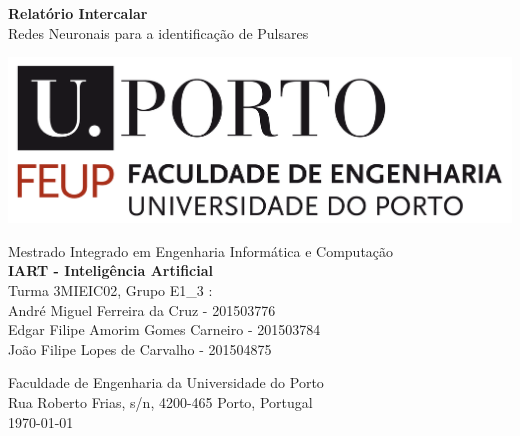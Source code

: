 \begin{titlepage}
  \begin{center}
    \vspace*{1cm}
    
	
      \Huge
      \textbf{Relatório Intercalar}\\
      \vspace{0.5cm}
      \LARGE Redes Neuronais para a identificação de Pulsares

    \vspace{1.5cm}

    \includegraphics[scale=0.15]{img/feup_logo.png}
    
	\vfill
	
	\Large{Mestrado Integrado em Engenharia Informática e Computação}\\
    \vspace{0.5cm}
	\Large\textbf{IART - Inteligência Artificial}\\
    
    \vspace{0.8cm}
    \large
    Turma 3MIEIC02, Grupo E1\_3 :\\
    André Miguel Ferreira da Cruz - 201503776\\
    Edgar Filipe Amorim Gomes Carneiro - 201503784\\
	João Filipe Lopes de Carvalho - 201504875\\
    \vspace{0.8cm}

    \Large
    Faculdade de Engenharia da Universidade do Porto\\
    Rua Roberto Frias, s/n, 4200-465 Porto, Portugal\\
    
    \vspace{1cm}
    \today

  \end{center}
\end{titlepage}